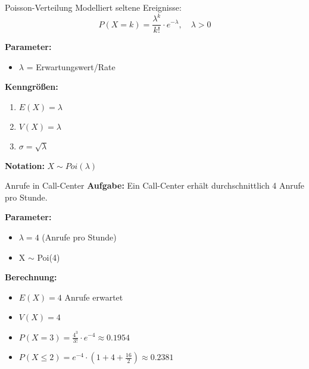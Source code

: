 \begin{definition}{Poisson-Verteilung}
Modelliert seltene Ereignisse:
$$P(X=k) = \frac{\lambda^k}{k!} \cdot e^{-\lambda}, \quad \lambda > 0$$

\textbf{Parameter:}
\begin{itemize}
    \item $\lambda$ = Erwartungswert/Rate
\end{itemize}

\textbf{Kenngrößen:}
\begin{enumerate}
    \item $E(X) = \lambda$
    \item $V(X) = \lambda$
    \item $\sigma = \sqrt{\lambda}$
\end{enumerate}

\textbf{Notation:} $X \sim Poi(\lambda)$
\end{definition}

\begin{example}{Anrufe in Call-Center}
\textbf{Aufgabe:} Ein Call-Center erhält durchschnittlich 4 Anrufe pro Stunde.

\textbf{Parameter:}
\begin{itemize}
\item $\lambda = 4$ (Anrufe pro Stunde)
\item X $\sim$ Poi(4)
\end{itemize}

\textbf{Berechnung:}
\begin{itemize}
\item $E(X) = 4$ Anrufe erwartet
\item $V(X) = 4$
\item $P(X=3) = \frac{4^3}{3!} \cdot e^{-4} \approx 0.1954$
\item $P(X \leq 2) = e^{-4} \cdot (1 + 4 + \frac{16}{2}) \approx 0.2381$
\end{itemize}
\end{example}

